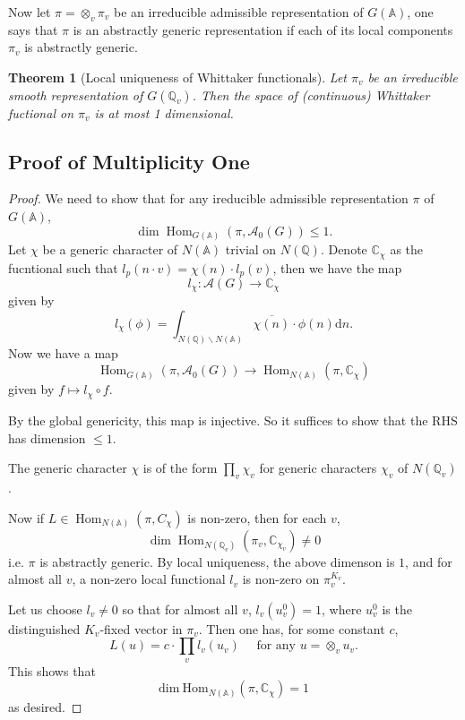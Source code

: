 \documentclass[11pt,english]{smfart}
\newtheorem{theorem}{Theorem}
\theoremstyle{definition}
\theoremstyle{remark}
\begin{document}
Now let $ \pi=\otimes_{v} \pi_{v} $ be an irreducible admissible representation of $ G(\mathbb{A})$,
one says that $ \pi $ is an abstractly generic representation if each of its local components $ \pi_{v}  $ is abstractly generic.
\begin{theorem}[Local uniqueness of Whittaker functionals]
    Let  $\pi_{v} $ be an irreducible smooth representation of $ G\left(\mathbb{Q}_{v}\right) $.
    Then the space of (continuous) Whittaker fuctional on $ \pi_{v} $ is at most 1 dimensional.
\end{theorem}
\subsection{Proof of Multiplicity One}
\begin{proof}
We need to show that for any ireducible admissible representation $ \pi $ of $ G(\mathbb{A}) $,
\[\operatorname{dim} \operatorname{Hom}_{G(\mathbb{A})}\left(\pi, \mathcal{A}_{0}(G)\right) \leq 1 .\]
Let $ \chi$ be a generic character of $ N(\mathbb{A}) $ trivial on $ N(\mathbb{Q})$. Denote $\mathbb{C}_\chi$ as the fucntional such that $l_p(n\cdot v)=\chi (n)\cdot l_p(v)$, then we have the map
\[l_{\chi}: \mathcal{A}(G) \longrightarrow \mathbb{C}_{\chi}\]
given by
\[l_{\chi}(\phi)=\int_{N(\mathbb{Q}) \backslash N(\mathbb{A})} \overline{\chi(n)} \cdot \phi(n) \mathrm{d} n .\]
Now we have a map
\[\operatorname{Hom}_{G(\mathbb{A})}\left(\pi, \mathcal{A}_{0}(G)\right) \longrightarrow \operatorname{Hom}_{N(\mathbb{A})}\left(\pi, \mathbb{C}_{\chi}\right)\]
given by $ f \mapsto l_{\chi} \circ f $.

By the global genericity, this map is injective.
So it suffices to show that the RHS has dimension $ \leq 1 $.

The generic character $ \chi $ is of the form $ \prod_{v} \chi_{v} $ for generic characters $ \chi_{v} $ of $ N\left(\mathbb{Q}_{v}\right) $.

Now if $ L \in \operatorname{Hom}_{N(\mathbb{A})}\left(\pi, C_{\chi}\right) $ is non-zero, then for each $ v $,
\[\operatorname{dim}{\operatorname{Hom}_{N\left(\mathbb{Q}_{v}\right)}}\left(\pi_{v}, \mathbb{C}_{\chi_{v}}\right) \neq 0\]
i.e. $ \pi $ is abstractly generic. By local uniqueness, the above dimenson is $1 $, and for almost all $ v $, a non-zero local functional $ l_{v} $ is non-zero on $ \pi_{v}^{K_{v}} $.

Let us choose $ l_{v} \neq 0 $ so that for almost all $ v $, $ l_{v}\left(u_{v}^{0}\right)=1 $, where $ u_{v}^{0} $ is the distinguished $ K_{v} $-fixed vector in $ \pi_{v} $.
Then one has, for some constant $ c$,
\[L(u)=c \cdot \prod_{v} l_{v}\left(u_{v}\right) \quad \text { for any } u=\otimes_v u_{v} .\]
This shows that
\[\mathrm{dim\ Hom}_{N(\mathbb{A})}(\pi,\mathbb{C}_\chi) =1\]
as desired.
\end{proof}
\end{document}
